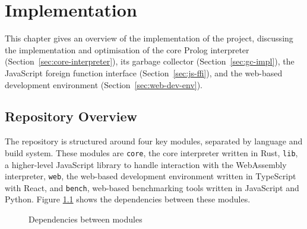 
\chapter{Implementation}

This chapter gives an overview of the implementation of the project, discussing the implementation and optimisation of the core Prolog interpreter (Section~\ref{sec:core-interpreter}), its garbage collector (Section~\ref{sec:gc-impl}), the JavaScript foreign function interface (Section~\ref{sec:js-ffi}), and the web-based development environment (Section~\ref{sec:web-dev-env}).

\section{Repository Overview}

The repository is structured around four key modules, separated by language and build system. These modules are \texttt{core}, the core interpreter written in Rust, \texttt{lib}, a higher-level JavaScript library to handle interaction with the WebAssembly interpreter, \texttt{web}, the web-based development environment written in TypeScript with React, and \texttt{bench}, web-based benchmarking tools written in JavaScript and Python. Figure \ref{fig:repo-deps} shows the dependencies between these modules.

\begin{figure}[H]
\centering
{}
\caption{Dependencies between modules}
\label{fig:repo-deps}
\end{figure}

